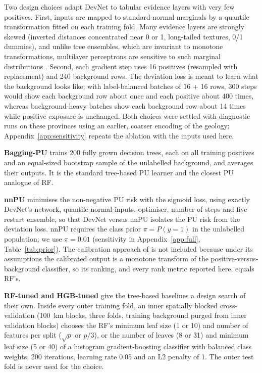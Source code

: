 \documentclass[pdflatex,sn-apa]{sn-jnl}
\begin{document}
Two design choices adapt DevNet to tabular evidence layers with very few positives. First, inputs are mapped to standard-normal marginals by a quantile transformation fitted on each training fold. Many evidence layers are strongly skewed (inverted distances concentrated near 0 or 1, long-tailed textures, 0/1 dummies), and unlike tree ensembles, which are invariant to monotone transformations, multilayer perceptrons are sensitive to such marginal distributions \citep{Gorishniy2021,Grinsztajn2022}. Second, each gradient step uses 16 positives (resampled with replacement) and 240 background rows. The deviation loss is meant to learn what the background looks like; with label-balanced batches of 16 + 16 rows, 300 steps would show each background row about once and each positive about 400 times, whereas background-heavy batches show each background row about 14 times while positive exposure is unchanged. Both choices were settled with diagnostic runs on these provinces using an earlier, coarser encoding of the geology; Appendix~\ref{app:sensitivity} repeats the ablation with the inputs used here.

\textbf{Bagging-PU} \citep{Mordelet2014} trains 200 fully grown decision trees, each on all training positives and an equal-sized bootstrap sample of the unlabelled background, and averages their outputs. It is the standard tree-based PU learner and the closest PU analogue of RF.

\textbf{nnPU} \citep{Kiryo2017} minimises the non-negative PU risk with the sigmoid loss, using exactly DevNet's network, quantile-normal inputs, optimiser, number of steps and five-restart ensemble, so that DevNet versus nnPU isolates the PU risk from the deviation loss. nnPU requires the class prior $\pi = P(y=1)$ in the unlabelled population; we use $\pi = 0.01$ (sensitivity in Appendix~\ref{app:full}, Table~\ref{tab:prior}). The calibration approach of \citet{Elkan2008} is not included because under its assumptions the calibrated output is a monotone transform of the positive-versus-background classifier, so its ranking, and every rank metric reported here, equals RF's.

\textbf{RF-tuned and HGB-tuned} give the tree-based baselines a design search of their own. Inside every outer training fold, an inner spatially blocked cross-validation (100~km blocks, three folds, training background purged from inner validation blocks) chooses the RF's minimum leaf size (1 or 10) and number of features per split ($\sqrt{p}$ or $p/3$), or the number of leaves (8 or 31) and minimum leaf size (5 or 40) of a histogram gradient-boosting classifier \citep{Pedregosa2011} with balanced class weights, 200 iterations, learning rate 0.05 and an L2 penalty of 1. The outer test fold is never used for the choice.
\end{document}
